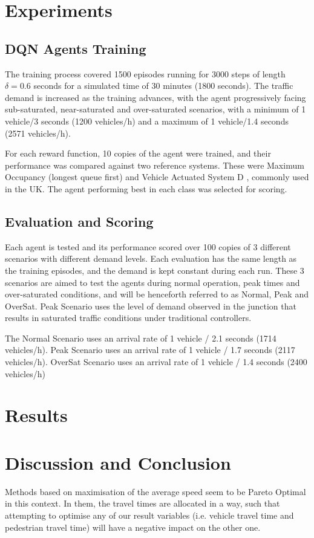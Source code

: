 \documentclass[conference]{IEEEtran}
\begin{document}
\section{Experiments}

\subsection{DQN Agents Training}
The training process covered 1500 episodes running for 3000 steps of length $\delta=0.6$ seconds for a simulated time of 30 minutes (1800 seconds).
The traffic demand is increased as the training advances, with the agent progressively facing sub-saturated, near-saturated and over-saturated scenarios, with a minimum of 1 vehicle/3 seconds (1200 vehicles/h) and a maximum of 1 vehicle/1.4 seconds (2571 vehicles/h).

For each reward function, 10 copies of the agent were trained, and their performance was compared against two reference systems. These were Maximum Occupancy (longest queue first) and Vehicle Actuated System D \cite{highways}, commonly used in the UK. The agent performing best in each class was selected for scoring.
\subsection{Evaluation and Scoring}
Each agent is tested and its performance scored over 100 copies of 3 different scenarios with different demand levels. Each evaluation has the same length as the training episodes, and the demand is kept constant during each run.
These 3 scenarios are aimed to test the agents during normal operation, peak times and over-saturated conditions, and will be henceforth referred to as Normal, Peak and OverSat.
Peak Scenario uses the level of demand observed in the junction that results in saturated traffic conditions under traditional controllers.

The Normal Scenario uses an arrival rate of 1 vehicle / 2.1 seconds (1714 vehicles/h). Peak Scenario uses an arrival rate of 1 vehicle / 1.7 seconds (2117 vehicles/h). OverSat Scenario uses an arrival rate of 1 vehicle / 1.4 seconds (2400 vehicles/h)

\section{Results}

\section{Discussion and Conclusion}
Methods based on maximisation of the average speed seem to be Pareto Optimal in this context.
In them, the travel times are allocated in a way, such that attempting to optimise any of our result variables (i.e. vehicle travel time and pedestrian travel time) will have a negative impact on the other one.
\end{document}
